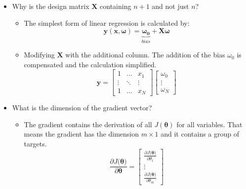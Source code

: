 \documentclass{article}
\begin{document}
\begin{itemize}
    
    \item Why is the design matrix $\boldsymbol{X}$ containing $n + 1$ and not just $n$?
    
    \begin{itemize} 
    
        \item The simplest form of linear regression is calculated by:
            $$\boldsymbol{y}(\boldsymbol{x, \omega}) = \underset{bias}{\underbrace{\boldsymbol{\omega_0}}} + \boldsymbol{X} \boldsymbol{\omega}$$
        \item Modifying $\boldsymbol{X}$ with the additional column. The addition of the bias $\omega_0$ is compensated and the calculation simplified. \\
      
            $$ \boldsymbol{y} = 
            \begin{bmatrix}
	            1		& \dots		& x_1	\\
	            \vdots	& \ddots 	& \vdots		\\
	            1		& \dots 		& x_N
	            \end{bmatrix}
	            \begin{bmatrix}
	            \omega_0 \\
	            \vdots	 \\
	            \omega_N	 
            \end{bmatrix} $$
     \end{itemize}
    
    \item What is the dimension of the gradient vector?
    
    \begin{itemize}
        \item The gradient contains the derivation of all $J\boldsymbol{(\theta)}$ for all variables. That means the gradient has the dimension $m \times 1$ and it contains a group of targets. \\        
            $$\frac{\partial J(\boldsymbol{\boldsymbol{\theta)}}}{\partial \boldsymbol{\theta}} =
            \begin{bmatrix}
            	\frac{\partial J(\boldsymbol{\theta)}}{\partial \theta_1}	 \\
            	\vdots \\
            	\frac{\partial J(\boldsymbol{\theta)}}{\partial \theta_m}  	
            \end{bmatrix}$$     
    \end{itemize} 
    

\end{itemize}
\end{document}
